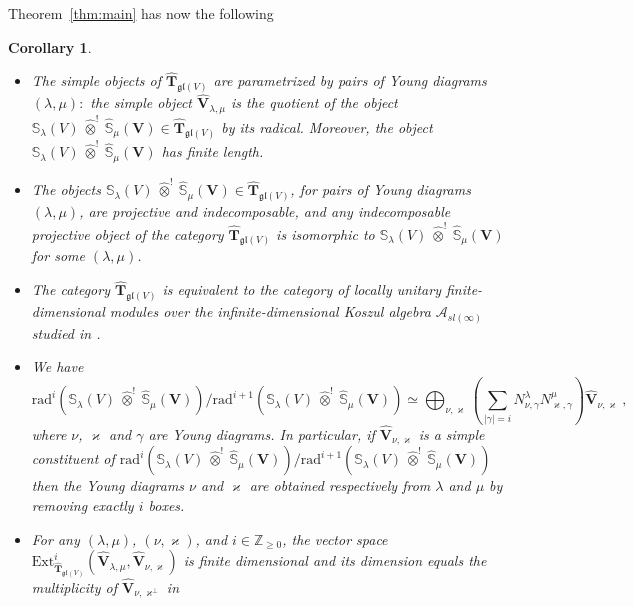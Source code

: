 \documentclass[12pt,reqno]{amsart}
\newtheorem{cor}[thm]{Corollary}
\theoremstyle{definition}
\theoremstyle{remark}
\begin{document}
	Theorem~\ref{thm:main} has now the following 
	\begin{cor}\phantom{text}\\
		\begin{itemize}
			\item[a)] The simple objects of $ \widehat{\mathbf{T}}_{\mathfrak{gl}(V)} $ are parametrized by pairs of Young diagrams $ (\lambda, \mu)\colon$ the simple object $\widehat{\mathbf{V}}_{\lambda, \mu} $ is the quotient of the object $ \mathbb{S}_{\lambda}(V)\ \widehat{\otimes}^! \ \widehat{\mathbb{S}}_{\mu}(\mathbf{V})\in \widehat{\mathbf{T}}_{\mathfrak{gl}(V)} $ by its radical. Moreover, the object $ \mathbb{S}_{\lambda}(V)\ \widehat{\otimes}^! \ \widehat{\mathbb{S}}_{\mu}(\mathbf{V})$ has finite length.
			\item[b)] The objects $ \mathbb{S}_{\lambda}(V)\ \widehat{\otimes}^! \ \widehat{\mathbb{S}}_{\mu}(\mathbf{V})\in \widehat{\mathbf{T}}_{\mathfrak{gl}(V)} $, for pairs of Young diagrams $ (\lambda, \mu) $, are projective and indecomposable, and any indecomposable projective object of the category $ \widehat{\mathbf{T}}_{\mathfrak{gl}(V)} $ is isomorphic to $ \mathbb{S}_{\lambda}(V)\ \widehat{\otimes}^! \ \widehat{\mathbb{S}}_{\mu}(\mathbf{V})$ for some $ (\lambda, \mu) $.
			\item[c)] The category $ \widehat{\mathbf{T}}_{\mathfrak{gl}(V)} $ is equivalent to the category of locally unitary finite-dimensional modules over the infinite-dimensional Koszul algebra $ \mathcal{A}_{sl(\infty)} $ studied in \cite[Sect. 4]{DPS}.
			\item[d)] We have 
			$$ \mathrm{rad}^{i}\left(\mathbb{S}_{\lambda}(V)\ \widehat{\otimes}^! \ \widehat{\mathbb{S}}_{\mu}(\mathbf{V})\right)/\mathrm{rad}^{i+1}\left(\mathbb{S}_{\lambda}(V)\ \widehat{\otimes}^! \ \widehat{\mathbb{S}}_{\mu}(\mathbf{V})\right) \simeq \bigoplus_{\nu, \varkappa}\left(\sum_{|\gamma| = i}N^{\lambda}_{\nu, \gamma}N^{\mu}_{\varkappa, \gamma}\right)\widehat{\mathbf{V}}_{\nu, \varkappa} \ , 
			$$
			where $\nu$, $\varkappa$ and $\gamma$ are Young diagrams.
			In particular, if $ \widehat{\mathbf{V}}_{\nu, \varkappa} $ is a simple constituent of $ \mathrm{rad}^{i}\left(\mathbb{S}_{\lambda}(V)\ \widehat{\otimes}^! \ \widehat{\mathbb{S}}_{\mu}(\mathbf{V})\right)/\mathrm{rad}^{i+1}\left(\mathbb{S}_{\lambda}(V)\ \widehat{\otimes}^! \ \widehat{\mathbb{S}}_{\mu}(\mathbf{V})\right)  $ then the Young diagrams $ \nu $ and $ \varkappa $ are obtained respectively from $ \lambda $ and $ \mu $ by removing exactly $ i $ boxes.
			\item[e)] For any $ (\lambda, \mu) $, $ (\nu, \varkappa) $, and $ i\in\mathbb{Z}_{\geqslant 0} $, the vector space $ \mathrm{Ext}^{i}_{{\widehat{\mathbf{T}}}_{\mathfrak{gl}(V)}}\left(\widehat{\mathbf{V}}_{\lambda, \mu}, \widehat{\mathbf{V}}_{\nu, \varkappa}\right) $ is finite dimensional and its dimension equals the multiplicity of $ \widehat{\mathbf{V}}_{\nu, \varkappa^{\perp}} $ in 

\end{itemize}
\end{cor}
\end{document}

